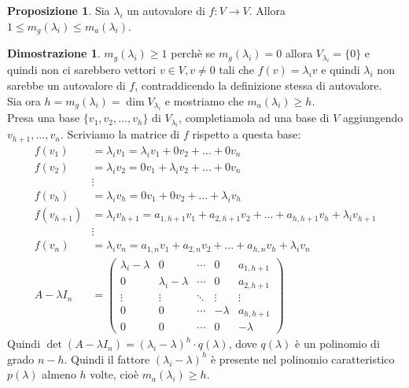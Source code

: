 \documentclass[a4paper]{article}
\theoremstyle{definition}
\newtheorem*{dimm}{Dimostrazione}
\newtheorem*{prop}{Proposizione}
\begin{document}
	\begin{prop}
		Sia $\lambda_i$ un autovalore di $f: V \to V$. Allora $1 \le m_g(\lambda_i) \le m_a(\lambda_i)$.
	\end{prop}
	\begin{dimm}
		$m_g(\lambda_i) \ge 1$ perchè se $m_g(\lambda_i) = 0$ allora $V_{\lambda_i} = \{0\}$
		e quindi non ci sarebbero vettori $v \in V, v \ne 0$ tali che $f(v) = \lambda_i v$ e quindi $\lambda_i$ non sarebbe un autovalore di $f$, contraddicendo la definizione stessa di autovalore. \\
		Sia ora $h = m_g(\lambda_i) = \dim V_{\lambda_i}$ e mostriamo che $m_a(\lambda_i) \ge h$. \\
		Presa una base $\{v_1, v_2, ..., v_h\}$ di $V_{\lambda_i}$, completiamola ad una base di $V$ aggiungendo $v_{h+1}, ..., v_n$.
		Scriviamo la matrice di $f$ rispetto a questa base:
		\begin{align*}
			f(v_1) &= \lambda_i v_1 = \lambda_i v_1 + 0v_2 + ... + 0v_n \\
			f(v_2) &= \lambda_i v_2 = 0v_1 + \lambda_i v_2 + ... + 0v_n \\
			&\vdots \\
			f(v_h) &= \lambda_i v_h = 0v_1 + 0v_2 + ... + \lambda_i v_h \\
			f(v_{h+1}) &= \lambda_i v_{h+1} = a_{1, h+1}v_1 + a_{2, h+1}v_2 + ... + a_{h, h+1}v_h + \lambda_i v_{h+1} \\
			&\vdots \\
			f(v_n) &= \lambda_i v_n = a_{1, n}v_1 + a_{2, n}v_2 + ... + a_{h, n}v_h + \lambda_i v_n \\
			A - \lambda I_n &= \begin{pmatrix}
				\lambda_i - \lambda & 0 & \cdots & 0 & a_{1, h+1} \\
				0 & \lambda_i - \lambda & \cdots & 0 & a_{2, h+1} \\
				\vdots & \vdots & \ddots & \vdots & \vdots \\
				0 & 0 & \cdots & - \lambda & a_{h, h+1} \\
				0 & 0 & \cdots & 0 & - \lambda
			\end{pmatrix}
		\end{align*}
		Quindi $\det(A - \lambda I_n) = (\lambda_i - \lambda)^h \cdot q(\lambda)$, dove $q(\lambda)$ è un polinomio di grado $n - h$.
		Quindi il fattore $(\lambda_i - \lambda)^h$ è presente nel polinomio caratteristico $p(\lambda)$ almeno $h$ volte, cioè $m_a(\lambda_i) \ge h$.
	\end{dimm}
\end{document}
